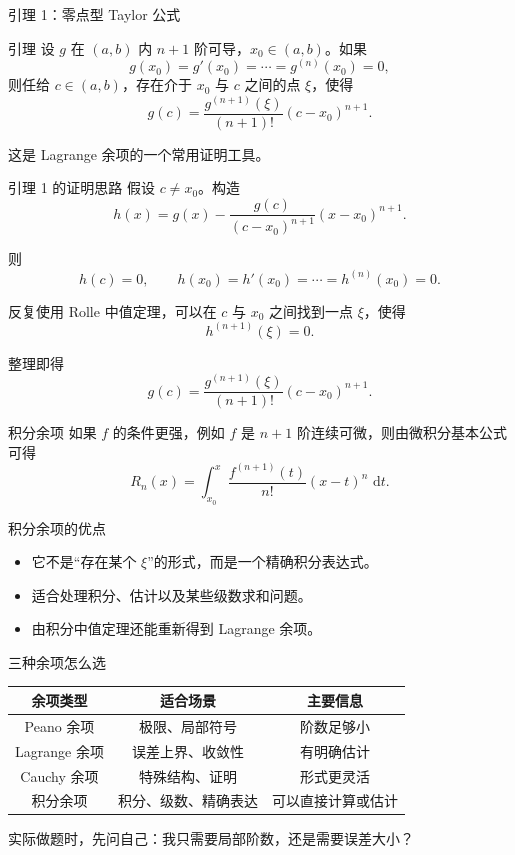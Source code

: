 \documentclass[aspectratio=169,11pt]{ctexbeamer}
\newcommand{\dd}{\,\mathrm{d}}
\begin{document}
\begin{frame}{引理 1：零点型 Taylor 公式}
\small
\begin{block}{引理}
设 $g$ 在 $(a,b)$ 内 $n+1$ 阶可导，$x_0\in(a,b)$。如果
\[
  g(x_0)=g'(x_0)=\cdots=g^{(n)}(x_0)=0,
\]
则任给 $c\in(a,b)$，存在介于 $x_0$ 与 $c$ 之间的点 $\xi$，使得
\[
  g(c)=\frac{g^{(n+1)}(\xi)}{(n+1)!}(c-x_0)^{n+1}.
\]
\end{block}

这是 Lagrange 余项的一个常用证明工具。
\end{frame}

\begin{frame}{引理 1 的证明思路}
\small
假设 $c\ne x_0$。构造
\[
  h(x)=g(x)-\frac{g(c)}{(c-x_0)^{n+1}}(x-x_0)^{n+1}.
\]

则
\[
  h(c)=0,\qquad h(x_0)=h'(x_0)=\cdots=h^{(n)}(x_0)=0.
\]

反复使用 Rolle 中值定理，可以在 $c$ 与 $x_0$ 之间找到一点 $\xi$，使得
\[
  h^{(n+1)}(\xi)=0.
\]

整理即得
\[
  g(c)=\frac{g^{(n+1)}(\xi)}{(n+1)!}(c-x_0)^{n+1}.
\]
\end{frame}

\begin{frame}{积分余项}
\small
如果 $f$ 的条件更强，例如 $f$ 是 $n+1$ 阶连续可微，则由微积分基本公式可得
\[
  R_n(x)
  =
  \int_{x_0}^{x}
  \frac{f^{(n+1)}(t)}{n!}(x-t)^n\,\dd t.
\]

\begin{block}{积分余项的优点}
\begin{itemize}
  \item 它不是“存在某个 $\xi$”的形式，而是一个精确积分表达式。
  \item 适合处理积分、估计以及某些级数求和问题。
  \item 由积分中值定理还能重新得到 Lagrange 余项。
\end{itemize}
\end{block}
\end{frame}

\begin{frame}{三种余项怎么选}
\small
\begin{center}
\begin{tabular}{c|c|c}
余项类型 & 适合场景 & 主要信息\\
\hline
Peano 余项 & 极限、局部符号 & 阶数足够小\\
Lagrange 余项 & 误差上界、收敛性 & 有明确估计\\
Cauchy 余项 & 特殊结构、证明 & 形式更灵活\\
积分余项 & 积分、级数、精确表达 & 可以直接计算或估计
\end{tabular}
\end{center}

\vspace{0.8em}
实际做题时，先问自己：我只需要局部阶数，还是需要误差大小？
\end{frame}
\end{document}
